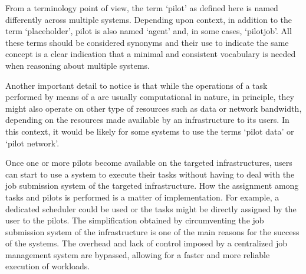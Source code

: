 \documentclass{sig-alternate}
\begin{document}
From a terminology point of view, the term `pilot' as defined here is
named differently across multiple \pilotjob systems. Depending upon
context, in addition to the term `placeholder', pilot is also named
`agent' and, in some cases, `pilotjob'.  All these terms should be considered synonyms and their use
to indicate the same concept is a clear indication that a minimal and
consistent vocabulary is needed when reasoning about multiple
\pilotjob systems.



Another important detail to notice is that while the operations of a
task performed by means of a \pilot are usually computational in
nature, in principle, they might also operate on other type of
resources such as data or network bandwidth, depending on the
resources made available by an infrastructure to its users. In this
context, it would be likely for some \pilotjob systems to use the
terms `pilot data' or `pilot network'.

  



Once one or more pilots become available on the targeted
infrastructures, users can start to use a \pilotjob system to execute
their tasks without having to deal with the job submission system of
the targeted infrastructure.  How the assignment  among tasks and pilots
is performed is a matter of implementation. For example, a dedicated
scheduler could be used or the tasks might be directly assigned by the
user to the pilots. The simplification obtained by circumventing the
job submission system of the infrastructure is one of the main reasons
for the success of the \pilotjob systems. The overhead and lack of
control imposed by a centralized job management system are bypassed,
allowing for a faster and more reliable execution of workloads.
\end{document}
